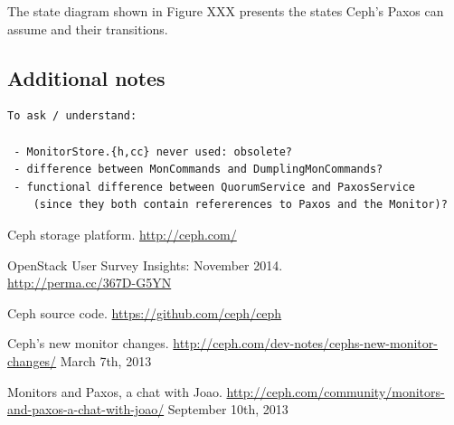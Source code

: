 \documentclass{article}
\begin{document}
The state diagram shown in Figure XXX presents the states Ceph's Paxos can assume and their transitions.





\subsection{Additional notes}

\begin{verbatim}
To ask / understand:
 
 - MonitorStore.{h,cc} never used: obsolete?
 - difference between MonCommands and DumplingMonCommands?
 - functional difference between QuorumService and PaxosService 
    (since they both contain refererences to Paxos and the Monitor)?
\end{verbatim}


\begin{thebibliography}{1}

   Ceph storage platform. \url{http://ceph.com/} 

   OpenStack User Survey Insights: November 2014. \\
  \url{http://perma.cc/367D-G5YN} 
  
   Ceph source code. \url{https://github.com/ceph/ceph} 
  
   Ceph's new monitor changes. \url{http://ceph.com/dev-notes/cephs-new-monitor-changes/} March 7th, 2013
  
   Monitors and Paxos, a chat with Joao. \url{http://ceph.com/community/monitors-and-paxos-a-chat-with-joao/} September 10th, 2013


\end{thebibliography}
	
\end{document}
